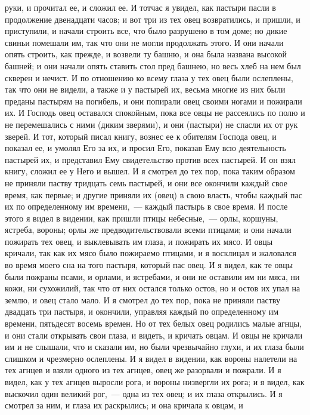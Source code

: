 руки, и прочитал ее, и сложил ее.
И тотчас я увидел, как пастыри пасли в продолжение двенадцати часов; и
вот три из тех овец возвратились, и пришли, и приступили, и начали строить все,
что было разрушено в том доме; но дикие свиньи помешали им, так что они не
могли продолжать этого.
И они начали опять строить, как прежде, и возвели ту башню, и она была
названа высокой башней; и они начали опять ставить стол пред башнею, но весь
хлеб на нем был скверен и нечист.
И по отношению ко всему глаза у тех овец были ослеплены, так что они
не видели, а также и у пастырей их, весьма многие из них были преданы пастырям
на погибель, и они попирали овец своими ногами и пожирали их.
И Господь овец оставался спокойным, пока все овцы не рассеялись по
полю и не перемешались с ними (диким зверями), и они (пастыри) не спасли их от
рук зверей.
И тот, который писал книгу, вознес ее к обителям Господа овец, и
показал ее, и умолял Его за их, и просил Его, показав Ему всю деятельность
пастырей их, и представил Ему свидетельство против всех пастырей.
И он взял книгу, сложил ее у Него и вышел.
И я смотрел до тех пор, пока таким образом не приняли паству
тридцать семь пастырей, и они все окончили каждый свое время, как первые; и
другие приняли их (овец) в свою власть, чтобы каждый пас их по определенному им
времени,~--- каждый пастырь в свое время.
И после этого я видел в видении, как пришли птицы небесные,~--- орлы,
коршуны, ястреба, вороны; орлы же предводительствовали всеми птицами; и они
начали пожирать тех овец, и выклевывать им глаза, и пожирать их мясо.
И овцы кричали, так как их мясо было пожираемо птицами, и я восклицал
и жаловался во время моего сна на того пастыря, который пас овец.
И я видел, как те овцы были пожраны псами, и орлами, и ястребами, и
они не оставили им ни мяса, ни кожи, ни сухожилий, так что от них остался
только остов, но и остов их упал на землю, и овец стало мало.
И я смотрел до тех пор, пока не приняли паству двадцать три пастыря,
и окончили, управляя каждый по определенному им времени, пятьдесят восемь
времен.
Но от тех белых овец родились малые агнцы, и они стали открывать свои
глаза, и видеть, и кричать овцам.
И овцы не кричали им и не слышали, что и сказали им, но были
чрезвычайно глухи, и их глаза были слишком и чрезмерно ослеплены.
И я видел в видении, как вороны налетели на тех агнцев и взяли одного
из тех агнцев, овец же разорвали и пожрали.
И я видел, как у тех агнцев выросли рога, и вороны низвергли их рога;
и я видел, как выскочил один великий рог,~--- одна из тех овец; и их глаза
открылись.
И я смотрел за ним, и глаза их раскрылись; и она кричала к овцам, и
